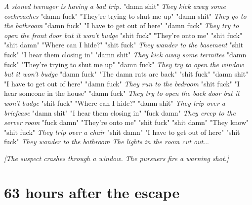 \documentclass{report}
\begin{document}
\textit{A stoned teenager is having a bad trip.} "damn shit" \textit{They kick away some cockroaches} "damn fuck" "They're trying to shut me up" "damn shit" \textit{They go to the bathroom} "damn fuck" "I have to get out of here" "damn fuck" \textit{They try to open the front door but it won't budge} "shit fuck" "They're onto me" "shit fuck" \textit{} "shit damn" "Where can I hide?" "shit fuck" \textit{They wander to the basement} "shit fuck" "I hear them closing in" "damn shit" \textit{They kick away some termites} "damn fuck" "They're trying to shut me up" "damn fuck" \textit{They try to open the window but it won't budge} "damn fuck" "The damn rats are back" "shit fuck" \textit{} "damn shit" "I have to get out of here" "damn fuck" \textit{They run to the bedroom} "shit fuck" "I hear someone in the house" "damn fuck" \textit{They try to open the back door but it won't budge} "shit fuck" "Where can I hide?" "damn shit" \textit{They trip over a briefcase} "damn shit" "I hear them closing in" "fuck damn" \textit{They creep to the server room} "fuck damn" "They're onto me" "shit fuck" \textit{} "shit damn" "They know" "shit fuck" \textit{They trip over a chair} "shit damn" "I have to get out of here" "shit fuck" \textit{They wander to the bathroom} \textit{The lights in the room cut out}...

\textit{[The suspect crashes through a window. The pursuers fire a warning shot.]}


\section*{63 \small{hours after the escape}}
\end{document}
